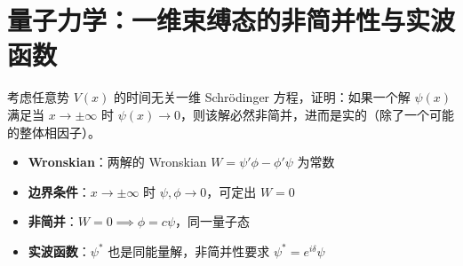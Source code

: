 \section{量子力学：一维束缚态的非简并性与实波函数}
\label{sec:1d-bound-state-nondegenerate}

\begin{modelbox}[题目：一维束缚态的非简并性与实波函数]
考虑任意势 $V(x)$ 的时间无关一维 Schrödinger 方程，证明：如果一个解 $\psi(x)$ 满足当 $x\to\pm\infty$ 时 $\psi(x)\to0$，则该解必然非简并，进而是实的（除了一个可能的整体相因子）。
\end{modelbox}

\begin{tipbox}[考点快速分析]
\begin{itemize}
    \item \textbf{Wronskian}：两解的 Wronskian $W=\psi'\phi-\phi'\psi$ 为常数
    \item \textbf{边界条件}：$x\to\pm\infty$ 时 $\psi,\phi\to0$，可定出 $W=0$
    \item \textbf{非简并}：$W=0\implies\phi=c\psi$，同一量子态
    \item \textbf{实波函数}：$\psi^*$ 也是同能量解，非简并性要求 $\psi^*=e^{i\delta}\psi$
\end{itemize}
\end{tipbox}

